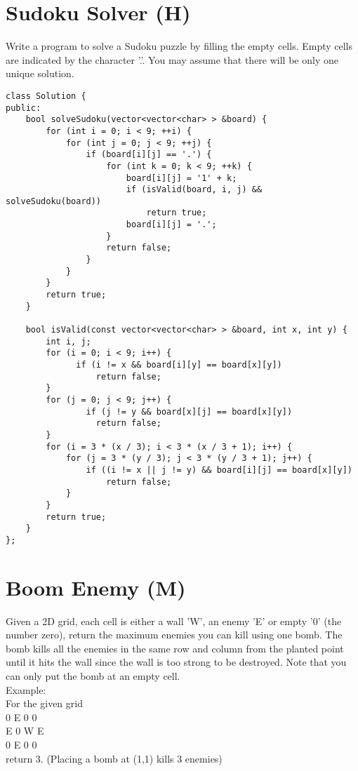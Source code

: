\section{Sudoku Solver (H)}
Write a program to solve a Sudoku puzzle by filling the empty cells. Empty cells are indicated by the character '.'. You may assume that there will be only one unique solution. \\

\begin{lstlisting}
class Solution {
public:
    bool solveSudoku(vector<vector<char> > &board) {
        for (int i = 0; i < 9; ++i) {
            for (int j = 0; j < 9; ++j) {
                if (board[i][j] == '.') {
                    for (int k = 0; k < 9; ++k) {
                        board[i][j] = '1' + k;
                        if (isValid(board, i, j) && solveSudoku(board))
                            return true;
                        board[i][j] = '.';
                    }
                    return false;
                }
            }
        }
        return true;
    }

    bool isValid(const vector<vector<char> > &board, int x, int y) {
        int i, j;
        for (i = 0; i < 9; i++) {  
              if (i != x && board[i][y] == board[x][y])
                  return false;
        }
        for (j = 0; j < 9; j++) {  
                if (j != y && board[x][j] == board[x][y])
                  return false;
        }
        for (i = 3 * (x / 3); i < 3 * (x / 3 + 1); i++) {
            for (j = 3 * (y / 3); j < 3 * (y / 3 + 1); j++) {
                if ((i != x || j != y) && board[i][j] == board[x][y])
                    return false;
            }
        }
        return true;
    }
};
\end{lstlisting}


\section{Boom Enemy (M)}
Given a 2D grid, each cell is either a wall 'W', an enemy 'E' or empty '0' (the number zero), return the maximum enemies you can kill using one bomb.
The bomb kills all the enemies in the same row and column from the planted point until it hits the wall since the wall is too strong to be destroyed.
Note that you can only put the bomb at an empty cell.\\

Example:\\
For the given grid\\
0 E 0 0\\
E 0 W E\\
0 E 0 0\\
return 3. (Placing a bomb at (1,1) kills 3 enemies)\\

